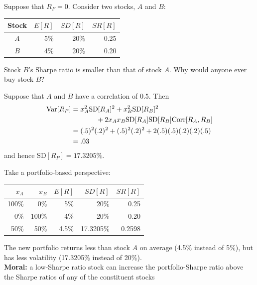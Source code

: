 \documentclass{beamer}
\begin{document}
\begin{frame}{}
	Suppose that $R_{F}=0$. Consider two stocks, $A$ and $B$: 
	\begin{table}[H]
		\begin{center}
			\begin{tabular}{crrr}
				Stock & $E[R]$ & $SD[R]$ & $SR[R]$ \\ \hline 
				$A$ & 5\% & 20\% & 0.25 \\  
				$B$ & 4\% & 20\% & 0.20
			\end{tabular}
		\end{center}
	\end{table} 
	Stock $B$'s Sharpe ratio is smaller than that of stock $A$. Why would anyone \underline{ever} buy stock $B$?
\end{frame}

\begin{frame}{}
	Suppose that $A$ and $B$ have a correlation of $0.5$. Then
	\begin{align*}
		\text{Var}[R_{P}]&=x_{A}^{2}\text{SD}[R_{A}]^{2}+x_{B}^{2}\text{SD}[R_{B}]^{2}\\
		&\hspace{.5in}+2x_{A}x_{B}\text{SD}[R_{A}]\text{SD}[R_{B}]\text{Corr}[R_{A},R_{B}]\\
		&=(.5)^2(.2)^2+(.5)^2(.2)^2+2(.5)(.5)(.2)(.2)(.5)\\
		&=.03
	\end{align*}
	and hence $\text{SD}[R_{P}]=17.3205\%$. 
\end{frame}

\begin{frame}{}
	Take a portfolio-based perspective:
	\begin{table}[H]
		\begin{center}
			\begin{tabular}{rrrrr}
				$x_{A}$ & $x_{B}$ & $E[R]$ & $SD[R]$ & $SR[R]$ \\ \hline 
				100\% & 0\% & 5\% & 20\% & 0.25 \\  
				0\% & 100\% & 4\% & 20\% & 0.20\\ \hline
				50\% & 50\% & 4.5\% & 17.3205\% & 0.2598
			\end{tabular}
		\end{center}
	\end{table} 
	The new portfolio returns less than stock $A$ on average (4.5\% instead of 5\%), but has less volatility (17.3205\% instead of 20\%).\\
	\vfill
 	\noindent\textbf{Moral:} a low-Sharpe ratio stock can increase the portfolio-Sharpe ratio above the Sharpe ratios of any of the constituent stocks
\end{frame}
\end{document}
